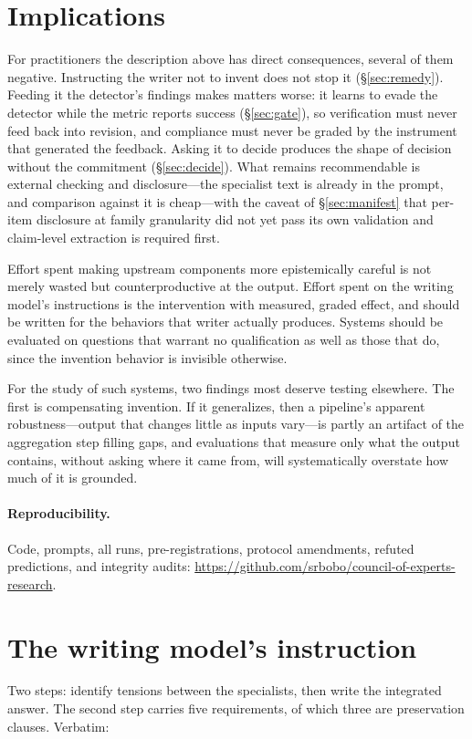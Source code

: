 \documentclass[11pt]{article}
\begin{document}
\section{Implications}
For practitioners the description above has direct consequences, several of
them negative. Instructing the writer not to invent does not stop it
(\S\ref{sec:remedy}). Feeding it the detector's findings makes matters
worse: it learns to evade the detector while the metric reports success
(\S\ref{sec:gate}), so verification must never feed back into revision,
and compliance must never be graded by the instrument that generated the
feedback. Asking it to decide produces the shape of decision without the
commitment (\S\ref{sec:decide}). What remains recommendable is external
checking and disclosure---the specialist text is already in the prompt, and
comparison against it is cheap---with the caveat of \S\ref{sec:manifest}
that per-item disclosure at family granularity did not yet pass its own
validation and claim-level extraction is required first.

 Effort spent
making upstream components more epistemically careful is not merely wasted but
counterproductive at the output. Effort spent on the writing model's
instructions is the intervention with measured, graded effect, and should be
written for the behaviors that writer actually produces. Systems should be
evaluated on questions that warrant no qualification as well as those that
do, since the invention behavior is invisible otherwise.

For the study of such systems, two findings most deserve testing elsewhere.
The first is compensating invention. If it generalizes, then a pipeline's
apparent robustness---output that changes little as inputs vary---is partly an
artifact of the aggregation step filling gaps, and evaluations that measure
only what the output contains, without asking where it came from, will
systematically overstate how much of it is grounded.

\paragraph{Reproducibility.} Code, prompts, all runs, pre-registrations,
protocol amendments, refuted predictions, and integrity audits:
\url{https://github.com/srbobo/council-of-experts-research}.

\appendix

\section{The writing model's instruction}
\label{app:prompt}
Two steps: identify tensions between the specialists, then write the
integrated answer. The second step carries five requirements, of which three
are preservation clauses. Verbatim:
\end{document}
